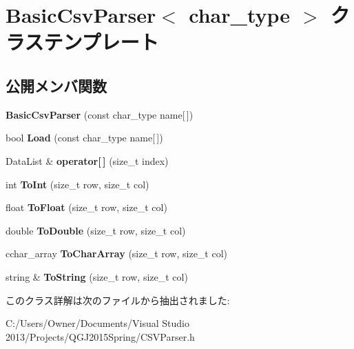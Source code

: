 \hypertarget{class_basic_csv_parser}{}\section{Basic\+Csv\+Parser$<$ char\+\_\+type $>$ クラステンプレート}
\label{class_basic_csv_parser}
\subsection*{公開メンバ関数}
\begin{DoxyCompactItemize}
\item 
{\bfseries Basic\+Csv\+Parser} (const char\+\_\+type name\mbox{[}$\,$\mbox{]})\hypertarget{class_basic_csv_parser_aff3c309709bd23e05016edb98e52167d}{}\label{class_basic_csv_parser_aff3c309709bd23e05016edb98e52167d}

\item 
bool {\bfseries Load} (const char\+\_\+type name\mbox{[}$\,$\mbox{]})\hypertarget{class_basic_csv_parser_a71918504fd2c735bcf64f35cba31f190}{}\label{class_basic_csv_parser_a71918504fd2c735bcf64f35cba31f190}

\item 
Data\+List \& {\bfseries operator\mbox{[}$\,$\mbox{]}} (size\+\_\+t index)\hypertarget{class_basic_csv_parser_a7e7420adc09ff53eb690bafbc260f046}{}\label{class_basic_csv_parser_a7e7420adc09ff53eb690bafbc260f046}

\item 
int {\bfseries To\+Int} (size\+\_\+t row, size\+\_\+t col)\hypertarget{class_basic_csv_parser_afa69994c6615803e98c9082718a924b5}{}\label{class_basic_csv_parser_afa69994c6615803e98c9082718a924b5}

\item 
float {\bfseries To\+Float} (size\+\_\+t row, size\+\_\+t col)\hypertarget{class_basic_csv_parser_ae02ebeb393a08ca344e2874fda2bda9a}{}\label{class_basic_csv_parser_ae02ebeb393a08ca344e2874fda2bda9a}

\item 
double {\bfseries To\+Double} (size\+\_\+t row, size\+\_\+t col)\hypertarget{class_basic_csv_parser_afe7e57ebf7992885726a5475e7fc33f5}{}\label{class_basic_csv_parser_afe7e57ebf7992885726a5475e7fc33f5}

\item 
cchar\+\_\+array {\bfseries To\+Char\+Array} (size\+\_\+t row, size\+\_\+t col)\hypertarget{class_basic_csv_parser_a282cdbb2c582ba6631e139809f09e01d}{}\label{class_basic_csv_parser_a282cdbb2c582ba6631e139809f09e01d}

\item 
string \& {\bfseries To\+String} (size\+\_\+t row, size\+\_\+t col)\hypertarget{class_basic_csv_parser_addb5c7c428985eab9cfb7d2745f75123}{}\label{class_basic_csv_parser_addb5c7c428985eab9cfb7d2745f75123}

\end{DoxyCompactItemize}


このクラス詳解は次のファイルから抽出されました\+:\begin{DoxyCompactItemize}
\item 
C\+:/\+Users/\+Owner/\+Documents/\+Visual Studio 2013/\+Projects/\+Q\+G\+J2015\+Spring/C\+S\+V\+Parser.\+h\end{DoxyCompactItemize}
